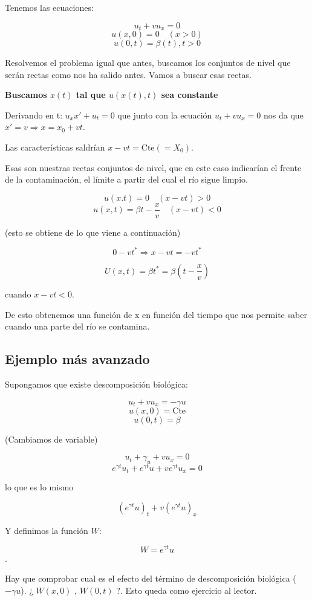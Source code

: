 \documentclass[palatino]{apuntes}
\begin{document}
Tenemos las ecuaciones:

$$u_t + vu_x = 0$$
$$u(x,0) = 0 \quad (x>0) $$
$$u(0,t) = \beta(t), t>0$$


Resolvemos el problema igual que antes, buscamos los conjuntos de nivel que serán rectas como nos ha salido antes. Vamos a buscar esas rectas.

\textbf{Buscamos $x(t)$ tal que $u(x(t),t)$ sea constante}

Derivando en t: $u_x x' + u_t = 0$ que junto con la ecuación $u_t + v u_x = 0$ nos da que $x' = v \Rightarrow x = x_0 + vt $.

Las características saldrían $x-vt = \text{Cte}(=X_0)$.

Esas son nuestras rectas conjuntos de nivel, que en este caso indicarían el frente de la contaminación, el límite a partir del cual el río sigue limpio.

$$u(x.t) = 0 \quad(x-vt) > 0 $$
$$u(x,t) = \beta{t - \frac{x}{v}} \quad (x-vt) < 0 $$

(esto se obtiene de lo que viene a continuación)

$$0 - vt^{*} \Rightarrow x-vt = -vt^{*}$$

$$U(x,t) = \beta{t^*} = \beta(t - \frac{x}{v})$$

cuando $x - vt < 0$.

De esto obtenemos una función de x en función del tiempo que nos permite saber cuando una parte del río se contamina.

\subsection{Ejemplo más avanzado}

Supongamos que existe descomposición biológica:

$$u_t + vu_x = -\gamma u$$
$$u(x,0) = \text{Cte}$$
$$u(0,t) = \beta$$

(Cambiamos de variable)

$$u_t + \gamma_u + vu_x = 0$$
$$e^{\gamma t} u_t + e^{\gamma t} u + v e^{ \gamma t} u_x = 0 $$

lo que es lo mismo

$$(e^{\gamma t}u)_t + v (e^{\gamma t} u)_x$$

Y definimos la función $W$:

$$W = e^{\gamma t}u$$.


Hay que comprobar cual es el efecto del término de descomposición biológica ($-\gamma u$). ¿ $W(x,0)$ , $ W(0,t)$ ?. Esto queda como ejercicio al lector.
\end{document}
